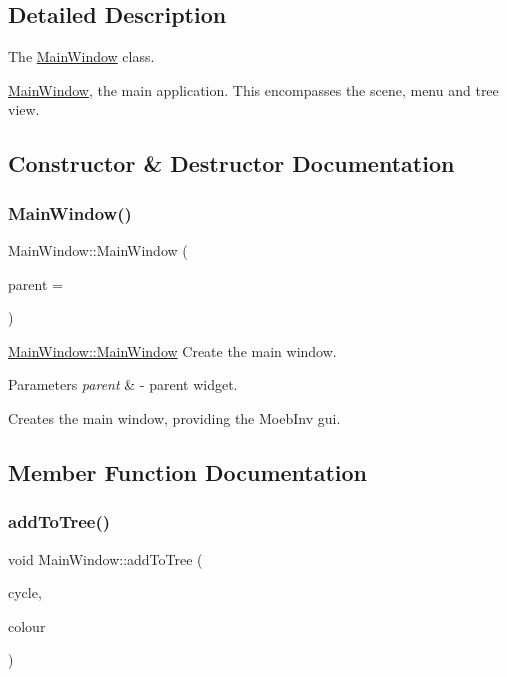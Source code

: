 \subsection{Detailed Description}
The \mbox{\hyperlink{class_main_window}{Main\+Window}} class. 

\mbox{\hyperlink{class_main_window}{Main\+Window}}, the main application. This encompasses the scene, menu and tree view. 

\subsection{Constructor \& Destructor Documentation}
\mbox{\label{class_main_window_a8b244be8b7b7db1b08de2a2acb9409db}} 
\subsubsection{\texorpdfstring{Main\+Window()}{MainWindow()}}
{\footnotesize\ttfamily Main\+Window\+::\+Main\+Window (\begin{DoxyParamCaption}\item[{Q\+Widget $\ast$}]{parent = {} }\end{DoxyParamCaption})\hspace{0.3cm}{\ttfamily [explicit]}}



\mbox{\hyperlink{class_main_window_a8b244be8b7b7db1b08de2a2acb9409db}{Main\+Window\+::\+Main\+Window}} Create the main window. 


\begin{DoxyParams}{Parameters}
{\em parent} & -\/ parent widget.\\
\hline
\end{DoxyParams}
Creates the main window, providing the Moeb\+Inv gui. 

\subsection{Member Function Documentation}
\mbox{\label{class_main_window_a816f983db7e31a8a3e8376538b44804f}} 
\subsubsection{\texorpdfstring{add\+To\+Tree()}{addToTree()}}
{\footnotesize\ttfamily void Main\+Window\+::add\+To\+Tree (\begin{DoxyParamCaption}\item[{const Gi\+Na\+C\+::ex \&}]{cycle,  }\item[{const Q\+Color \&}]{colour }\end{DoxyParamCaption})}



